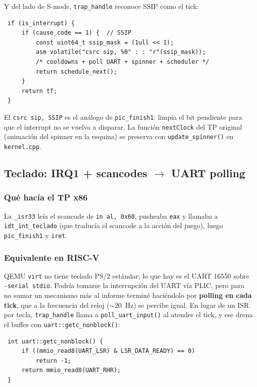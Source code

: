 Y del lado de S-mode, \texttt{trap\_handle} reconoce SSIP como el tick:

\begin{codesnippet}
\begin{verbatim}
 if (is_interrupt) {
     if (cause_code == 1) {  // SSIP
         const uint64_t ssip_mask = (1ull << 1);
         asm volatile("csrc sip, %0" : : "r"(ssip_mask));
         /* cooldowns + poll UART + spinner + scheduler */
         return schedule_next();
     }
     return tf;
 }
\end{verbatim}
\end{codesnippet}

El \texttt{csrc sip, SSIP} es el análogo de \texttt{pic\_finish1}: limpia el bit pendiente para que el interrupt no se
vuelva a disparar. La función \texttt{nextClock} del TP original (animación del spinner en la esquina) se preserva con
\texttt{update\_spinner()} en \texttt{kernel.cpp}.

\subsection{Teclado: IRQ1 + scancodes $\to$ UART polling}

\subsubsection*{Qué hacía el TP x86}

La \texttt{\_isr33} leía el scancode de \texttt{in al, 0x60}, pusheaba \texttt{eax} y llamaba a
\texttt{idt\_int\_teclado} (que traducía el scancode a la acción del juego), luego \texttt{pic\_finish1} y
\texttt{iret}.

\subsubsection*{Equivalente en RISC-V}

QEMU \texttt{virt} no tiene teclado PS/2 estándar; lo que hay es el UART 16550 sobre \texttt{-serial stdio}. Podría
tomarse la interrupción del UART vía PLIC, pero para no sumar un mecanismo más al informe terminé haciéndolo por
\textbf{polling en cada tick}, que a la frecuencia del reloj ($\sim$20~Hz) se percibe igual. En lugar de un ISR por
tecla, \texttt{trap\_handle} llama a \texttt{poll\_uart\_input()} al atender el tick, y ese drena el buffer con
\texttt{uart::getc\_nonblock()}:

\begin{codesnippet}
\begin{verbatim}
 int uart::getc_nonblock() {
     if ((mmio_read8(UART_LSR) & LSR_DATA_READY) == 0)
         return -1;
     return mmio_read8(UART_RHR);
 }
\end{verbatim}
\end{codesnippet}

